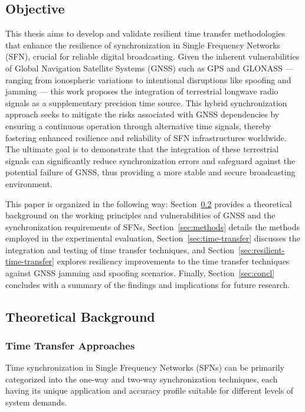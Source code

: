 \documentclass[12pt, a4paper]{extarticle}
\begin{document}
\subsection{Objective}

This thesis aims to develop and validate resilient time transfer methodologies
that enhance the resilience of synchronization in Single Frequency Networks
(SFN), crucial for reliable digital broadcasting. Given the inherent
vulnerabilities of Global Navigation Satellite Systems (GNSS) such as GPS and
GLONASS --- ranging from ionospheric variations to intentional disruptions like
spoofing and jamming --- this work proposes the integration of terrestrial
longwave radio signals as a supplementary precision time source. This hybrid
synchronization approach seeks to mitigate the risks associated with GNSS
dependencies by ensuring a continuous operation through alternative time signals,
thereby fostering enhanced resilience and reliability of SFN infrastructures
worldwide. The ultimate goal is to demonstrate that the integration of these
terrestrial signals can significantly reduce synchronization errors and
safeguard against the potential failure of GNSS, thus providing a more stable
and secure broadcasting environment.

This paper is organized in the following way: Section~\ref{sec:theory} provides
a theoretical background on the working principles and vulnerabilities of GNSS
and the synchronization requirements of SFNs, Section~\ref{sec:methods} details
the methods employed in the experimental evaluation,
Section~\ref{sec:time-transfer} discusses the integration and testing of time
transfer techniques, and Section~\ref{sec:resilient-time-transfer} explores
resiliency improvements to the time transfer techniques against GNSS jamming
and spoofing scenarios. Finally, Section~\ref{sec:concl} concludes with a
summary of the findings and implications for future research.

\subsection{Theoretical Background}\label{sec:theory}

\subsubsection{Time Transfer Approaches}

Time synchronization in Single Frequency Networks (SFNs) can be primarily
categorized into the one-way and two-way synchronization techniques, each having
its unique application and accuracy profile suitable for different levels of
system demands.
\end{document}
